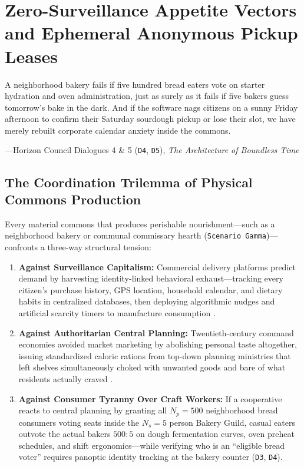 \chapter{Zero-Surveillance Appetite Vectors and Ephemeral Anonymous Pickup Leases}
\label{ch:anonymous-appetite-leases}

\epigraph{A neighborhood bakery fails if five hundred bread eaters vote on starter hydration and oven administration, just as surely as it fails if five bakers guess tomorrow's bake in the dark. And if the software nags citizens on a sunny Friday afternoon to confirm their Saturday sourdough pickup or lose their slot, we have merely rebuilt corporate calendar anxiety inside the commons.}{---Horizon Council Dialogues 4 \& 5 (\texttt{D4}, \texttt{D5}), \textit{The Architecture of Boundless Time}}

\section{The Coordination Trilemma of Physical Commons Production}
\label{sec:ch4-coordination-trilemma}

Every material commons that produces perishable nourishment---such as a neighborhood bakery or communal commissary hearth (\texttt{Scenario Gamma})---confronts a three-way structural tension:
\begin{enumerate}
    \item \textbf{Against Surveillance Capitalism:} Commercial delivery platforms predict demand by harvesting identity-linked behavioral exhaust---tracking every citizen's purchase history, GPS location, household calendar, and dietary habits in centralized databases, then deploying algorithmic nudges and artificial scarcity timers to manufacture consumption \parencite{zuboff2019}.
    \item \textbf{Against Authoritarian Central Planning:} Twentieth-century command economies avoided market marketing by abolishing personal taste altogether, issuing standardized caloric rations from top-down planning ministries that left shelves simultaneously choked with unwanted goods and bare of what residents actually craved \parencite{scott1998}.
    \item \textbf{Against Consumer Tyranny Over Craft Workers:} If a cooperative reacts to central planning by granting all $N_p = 500$ neighborhood bread consumers voting seats inside the $N_s = 5$ person Bakery Guild, casual eaters outvote the actual bakers $500 : 5$ on dough fermentation curves, oven preheat schedules, and shift ergonomics---while verifying who is an ``eligible bread voter'' requires panoptic identity tracking at the bakery counter (\texttt{D3}, \texttt{D4}).
\end{enumerate}

